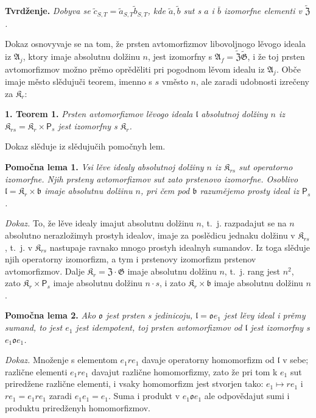 \documentclass[11pt]{article}
\begin{document}
\noindent\textbf{Tvrdženje.} \emph{Dobyva se \(\tilde c_{S,T}=\tilde a_{S,T}\tilde b_{S,T}\), kde \(\tilde a,\tilde b\) sut s \(a\) i \(\bar b\) izomorfne elementi v \(\widetilde{\mathfrak Z}\).}

Dokaz osnovyvaje se na tom, že prsten avtomorfizmov libovoljnogo lěvogo ideala iz \(\mathfrak A_j\), ktory imaje absolutnu dolžinu \(n\), jest izomorfny s \(\mathfrak A_f=\widetilde{\mathfrak Z}\widetilde{\mathfrak G}\), i že toj prsten avtomorfizmov možno prěmo oprěděliti pri pogodnom lěvom idealu iz \(\mathfrak A_j\). Obče imaje město slědujuči teorem, imenno s \(s\) vměsto \(n\), ale zaradi udobnosti izrečeny za \(\mathfrak K_r\):

\noindent\textbf{1. Teorem 1.} \emph{Prsten avtomorfizmov lěvogo ideala \(\mathfrak l\) absolutnoj dolžiny \(n\) iz \(\mathfrak K_{rs}=\mathfrak K_r\times \mathsf{P}_s\) jest izomorfny s \(\mathfrak K_r\).}

Dokaz slěduje iz slědujučih pomočnyh lem.

\noindent\textbf{Pomočna lema 1.} \emph{Vsi lěve idealy absolutnoj dolžiny \(n\) iz \(\mathfrak K_{rs}\) sut operatorno izomorfne. Njih prsteny avtomorfizmov sut zato prstenovo izomorfne. Osoblivo \(\mathfrak l=\mathfrak K_r\times\mathfrak b\) imaje absolutnu dolžinu \(n\), pri čem pod \(\mathfrak b\) razumějemo prosty ideal iz \(\mathsf{P}_s\).}

\noindent\emph{Dokaz.} To, že lěve idealy imajut absolutnu dolžinu \(n\), t.~j. razpadajut se na \(n\) absolutno nerazložimyh prostyh idealov, imaje za poslědicu jednaku dolžinu v \(\mathfrak K_{rs}\), t.~j. v \(\mathfrak K_{rs}\) nastupaje ravnako mnogo prostyh idealnyh sumandov. Iz toga slěduje njih operatorny izomorfizm, a tym i prstenovy izomorfizm prstenov avtomorfizmov. Dalje \(\mathfrak K_r=\mathfrak Z\cdot\mathfrak G\) imaje absolutnu dolžinu \(n\), t.~j. rang jest \(n^2\), zato \(\mathfrak K_r\times \mathsf{P}_s\) imaje absolutnu dolžinu \(n\cdot s\), i zato \(\mathfrak K_r\times\mathfrak b\) imaje absolutnu dolžinu \(n\).

\noindent\textbf{Pomočna lema 2.} \emph{Ako \(\mathfrak o\) jest prsten s jedinicoju, \(\mathfrak l=\mathfrak o e_1\) jest lěvy ideal i prěmy sumand, to jest \(e_1\) jest idempotent, toj prsten avtomorfizmov od \(\mathfrak l\) jest izomorfny s \(e_1\mathfrak o e_1\).}

\noindent\emph{Dokaz.} Množenje s elementom \(e_1re_1\) davaje operatorny homomorfizm od \(\mathfrak l\) v sebe; različne elementi \(e_1re_1\) davajut različne homomorfizmy, zato že pri tom k \(e_1\) sut priredžene različne elementi, i vsaky homomorfizm jest stvorjen tako: \(e_1\mapsto re_1\) i \(re_1=e_1re_1\) zaradi \(e_1e_1=e_1\). Suma i produkt v \(e_1\mathfrak o e_1\) ale odpovědajut sumi i produktu priredženyh homomorfizmov.
\end{document}
